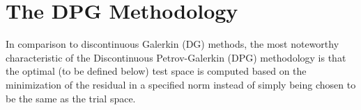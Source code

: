 \chapter{The DPG Methodology}

In comparison to discontinuous Galerkin (DG) methods, the most noteworthy characteristic of the Discontinuous Petrov-Galerkin (DPG) methodology is that the optimal (to be defined below) test space is computed based on the minimization of the residual in a specified norm instead of simply being chosen to be the same as the trial space.


